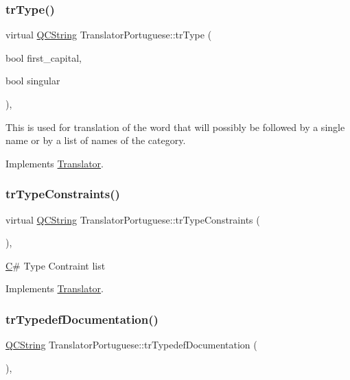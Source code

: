 \subsubsection{\texorpdfstring{trType()}{trType()}}
{\footnotesize\ttfamily virtual \mbox{\hyperlink{class_q_c_string}{Q\+C\+String}} Translator\+Portuguese\+::tr\+Type (\begin{DoxyParamCaption}\item[{bool}]{first\+\_\+capital,  }\item[{bool}]{singular }\end{DoxyParamCaption})\hspace{0.3cm}{\ttfamily [inline]}, {\ttfamily [virtual]}}

This is used for translation of the word that will possibly be followed by a single name or by a list of names of the category. 

Implements \mbox{\hyperlink{class_translator}{Translator}}.

\mbox{\label{class_translator_portuguese_ac03a91700d218a5b76c0af6743dd3e08}} 
\subsubsection{\texorpdfstring{trTypeConstraints()}{trTypeConstraints()}}
{\footnotesize\ttfamily virtual \mbox{\hyperlink{class_q_c_string}{Q\+C\+String}} Translator\+Portuguese\+::tr\+Type\+Constraints (\begin{DoxyParamCaption}{ }\end{DoxyParamCaption})\hspace{0.3cm}{\ttfamily [inline]}, {\ttfamily [virtual]}}

\mbox{\hyperlink{class_c}{C}}\# Type Contraint list 

Implements \mbox{\hyperlink{class_translator}{Translator}}.

\mbox{\label{class_translator_portuguese_ad4fa7d15e54a3cf40a5b84e904eee276}} 
\subsubsection{\texorpdfstring{trTypedefDocumentation()}{trTypedefDocumentation()}}
{\footnotesize\ttfamily \mbox{\hyperlink{class_q_c_string}{Q\+C\+String}} Translator\+Portuguese\+::tr\+Typedef\+Documentation (\begin{DoxyParamCaption}{ }\end{DoxyParamCaption})\hspace{0.3cm}{\ttfamily [inline]}, {\ttfamily [virtual]}}

